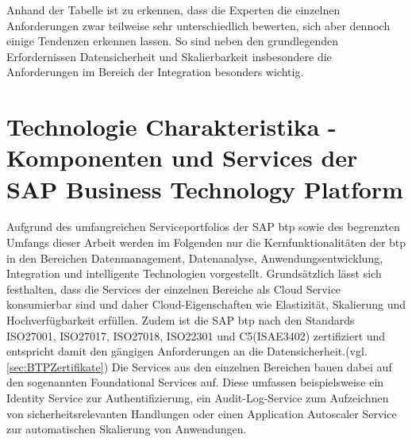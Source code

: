 Anhand der Tabelle ist zu erkennen, dass die Experten die einzelnen Anforderungen zwar teilweise sehr unterschiedlich bewerten, sich aber dennoch einige Tendenzen erkennen lassen. So sind neben den grundlegenden Erfordernissen Datensicherheit und Skalierbarkeit insbesondere die Anforderungen im Bereich der Integration besonders wichtig. 










\section{Technologie Charakteristika - Komponenten und Services der SAP Business Technology Platform}\label{sec:TechCharak}


Aufgrund des umfangreichen Serviceportfolios der SAP \ac{btp} sowie des begrenzten Umfangs dieser Arbeit werden im Folgenden nur die Kernfunktionalitäten der \ac{btp} in den Bereichen Datenmanagement, Datenanalyse, Anwendungsentwicklung, Integration und intelligente Technologien vorgestellt. Grundsätzlich lässt sich festhalten, dass die Services der einzelnen Bereiche als Cloud Service konsumierbar sind und daher Cloud-Eigenschaften wie Elastizität, Skalierung und Hochverfügbarkeit erfüllen. \autocite[Vgl.][S. 60]{SEUBERT} Zudem ist die SAP \ac{btp} nach den Standards ISO27001, ISO27017, ISO27018, ISO22301 und C5(ISAE3402) zertifiziert und entspricht damit den gängigen Anforderungen an die Datensicherheit.(vgl. \ref{sec:BTPZertifikate}) Die Services aus den einzelnen Bereichen bauen dabei auf den sogenannten Foundational Services auf. Diese umfassen beispielsweise ein Identity Service zur Authentifizierung, ein Audit-Log-Service zum Aufzeichnen von sicherheitsrelevanten Handlungen oder einen Application Autoscaler Service zur automatischen Skalierung von Anwendungen. \autocite[Vgl.][S. 58]{SEUBERT}


